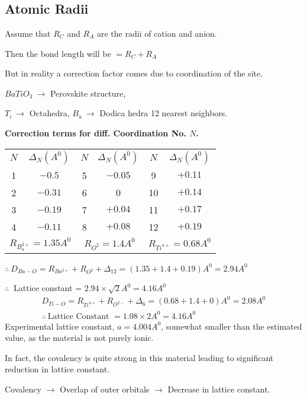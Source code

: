 \chapter{}\label{lec16}

\section*{Atomic Radii}

Assume that $R_{C}$ and $R_{A}$ are the radii of cation and anion.

Then the bond length will be $=R_{C}+R_{A}$

But in reality a correction factor comes due to coordination of the site.

\begin{example*}
$BaTiO_{3} \ \to$ Perovskite structure,

$T_{i} \ \to$ Octahedra, $B_{a} \ \to$ Dodica hedra 12 nearest neighbors.
\begin{center}
{\bf Correction terms for diff. Coordination No. \boldmath$N$.}
\medskip

\begin{tabular}{cc|cc|cc}
\hline
$N$ & $\Delta_{N}(A^{0})$ & $N$ & $\Delta_{N}(A^{0})$ & $N$ & $\Delta_{N}(A^{0})$\\
1 & $-0.5$ & 5 & $-0.05$ & 9 & $+0.11$\\
2 & $-0.31$ & 6 & 0 & 10 & $+0.14$\\
3 & $-0.19$ & 7 & $+0.04$ & 11 & $+0.17$\\
4 & $-0.11$ & 8 & $+0.08$ & 12 & $+0.19$\\
\hline
\multicolumn{2}{c}{$R_{B^{2+}_{a}}=1.35A^{0}$} & \multicolumn{2}{c}{$R_{O^{2}}=1.4A^{0}$} & \multicolumn{2}{c}{$R_{Ti^{4+}}=0.68A^{0}$}\\
\hline
\end{tabular}
\end{center}

$\therefore \ D_{Ba-O}=R_{Ba^{2+}}+R_{O^{2}}+\Delta_{12}=(1.35+1.4+0.19)A^{0}=2.94A^{0}$

$\therefore \ $ Lattice constant = $2.94\times \sqrt{2}A^{0}=4.16A^{0}$
\begin{gather*}
D_{Ti-O}=R_{Ti^{4+}}+R_{O^{2-}}+\Delta_{6}=(0.68+1.4+0)A^{0}=2.08A^{0}\\
\therefore \ \text{Lattice Constant } =1.08\times 2 A^{0}=4.16A^{0}
\end{gather*}
Experimental lattice constant, $a=4.004A^{0}$, somewhat smaller than the estimated value, as the material is not purely ionic.

In fact, the covalency is quite strong in this material leading to significant reduction in lattice constant.

Covalency $\to$ Overlap of outer orbitals $\to$ Decrease in lattice constant.
\end{example*}

